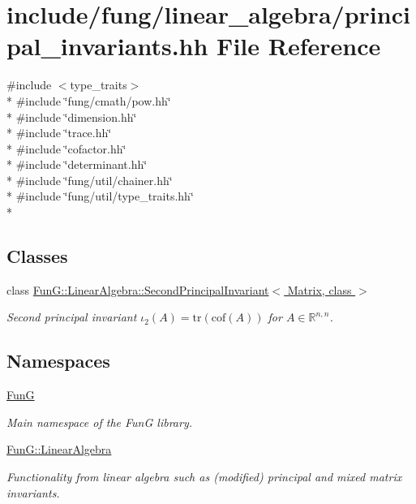 \hypertarget{principal__invariants_8hh}{\section{include/fung/linear\-\_\-algebra/principal\-\_\-invariants.hh File Reference}
\label{principal__invariants_8hh}
}
{\ttfamily \#include $<$type\-\_\-traits$>$}\\*
{\ttfamily \#include \char`\"{}fung/cmath/pow.\-hh\char`\"{}}\\*
{\ttfamily \#include \char`\"{}dimension.\-hh\char`\"{}}\\*
{\ttfamily \#include \char`\"{}trace.\-hh\char`\"{}}\\*
{\ttfamily \#include \char`\"{}cofactor.\-hh\char`\"{}}\\*
{\ttfamily \#include \char`\"{}determinant.\-hh\char`\"{}}\\*
{\ttfamily \#include \char`\"{}fung/util/chainer.\-hh\char`\"{}}\\*
{\ttfamily \#include \char`\"{}fung/util/type\-\_\-traits.\-hh\char`\"{}}\\*
\subsection*{Classes}
\begin{DoxyCompactItemize}
\item 
class \hyperlink{classFunG_1_1LinearAlgebra_1_1SecondPrincipalInvariant}{Fun\-G\-::\-Linear\-Algebra\-::\-Second\-Principal\-Invariant$<$ Matrix, class $>$}
\begin{DoxyCompactList}\small\item\em Second principal invariant $ \iota_2(A)=\mathrm{tr}(\mathrm{cof}(A)) $ for $A\in\mathbb{R}^{n,n}$. \end{DoxyCompactList}\end{DoxyCompactItemize}
\subsection*{Namespaces}
\begin{DoxyCompactItemize}
\item 
\hyperlink{namespaceFunG}{Fun\-G}
\begin{DoxyCompactList}\small\item\em Main namespace of the Fun\-G library. \end{DoxyCompactList}\item 
\hyperlink{namespaceFunG_1_1LinearAlgebra}{Fun\-G\-::\-Linear\-Algebra}
\begin{DoxyCompactList}\small\item\em Functionality from linear algebra such as (modified) principal and mixed matrix invariants. \end{DoxyCompactList}\end{DoxyCompactItemize}
